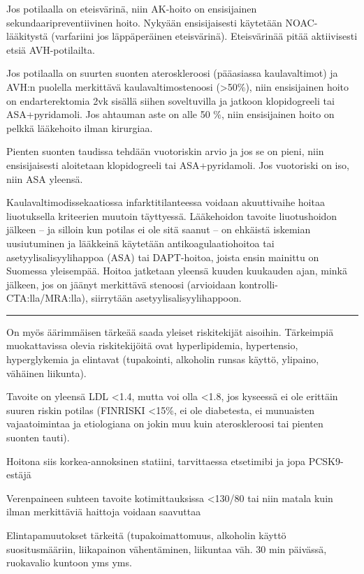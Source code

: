 \documentclass[
]{book}
\begin{document}
Jos potilaalla on eteisvärinä, niin AK-hoito on ensisijainen sekundaaripreventiivinen hoito. Nykyään ensisijaisesti käytetään NOAC-lääkitystä (varfariini jos läppäperäinen eteisvärinä). Eteisvärinää pitää aktiivisesti etsiä AVH-potilailta.

Jos potilaalla on suurten suonten ateroskleroosi (pääasiassa kaulavaltimot) ja AVH:n puolella merkittävä kaulavaltimostenoosi (\textgreater50\%), niin ensisijainen hoito on endarterektomia 2vk sisällä siihen soveltuvilla ja jatkoon klopidogreeli tai ASA+pyridamoli. Jos ahtauman aste on alle 50 \%, niin ensisijainen hoito on pelkkä lääkehoito ilman kirurgiaa.

Pienten suonten taudissa tehdään vuotoriskin arvio ja jos se on pieni, niin ensisijaisesti aloitetaan klopidogreeli tai ASA+pyridamoli. Jos vuotoriski on iso, niin ASA yleensä.

Kaulavaltimodissekaatiossa infarktitilanteessa voidaan akuuttivaihe hoitaa liuotuksella kriteerien muutoin täyttyessä. Lääkehoidon tavoite liuotushoidon jälkeen -- ja silloin kun potilas ei ole sitä saanut -- on ehkäistä iskemian uusiutuminen ja lääkkeinä käytetään antikoagulaatiohoitoa tai asetyylisalisyylihappoa (ASA) tai DAPT-hoitoa, joista ensin mainittu on Suomessa yleisempää. Hoitoa jatketaan yleensä kuuden kuukauden ajan, minkä jälkeen, jos on jäänyt merkittävä stenoosi (arvioidaan kontrolli-CTA:lla/MRA:lla), siirrytään asetyylisalisyylihappoon.

\begin{center}\rule{0.5\linewidth}{0.5pt}\end{center}

On myös äärimmäisen tärkeää saada yleiset riskitekijät aisoihin. Tärkeimpiä muokattavissa olevia riskitekijöitä ovat hyperlipidemia, hypertensio, hyperglykemia ja elintavat (tupakointi, alkoholin runsas käyttö, ylipaino, vähäinen liikunta).

Tavoite on yleensä LDL \textless1.4, mutta voi olla \textless1.8, jos kyseessä ei ole erittäin suuren riskin potilas (FINRISKI \textless15\%, ei ole diabetesta, ei munuaisten vajaatoimintaa ja etiologiana on jokin muu kuin ateroskleroosi tai pienten suonten tauti).

Hoitona siis korkea-annoksinen statiini, tarvittaessa etsetimibi ja jopa PCSK9-estäjä

Verenpaineen suhteen tavoite kotimittauksissa \textless130/80 tai niin matala kuin ilman merkittäviä haittoja voidaan saavuttaa

Elintapamuutokset tärkeitä (tupakoimattomuus, alkoholin käyttö suositusmääriin, liikapainon vähentäminen, liikuntaa väh. 30 min päivässä, ruokavalio kuntoon yms yms.
\end{document}
